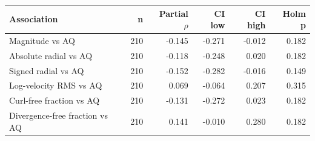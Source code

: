 \begin{tabular}{lrrrrr}
\toprule
Association & n & Partial $\rho$ & CI low & CI high & Holm p \\
\midrule
Magnitude vs AQ & 210 & -0.145 & -0.271 & -0.012 & 0.182 \\
Absolute radial vs AQ & 210 & -0.118 & -0.248 & 0.020 & 0.182 \\
Signed radial vs AQ & 210 & -0.152 & -0.282 & -0.016 & 0.149 \\
Log-velocity RMS vs AQ & 210 & 0.069 & -0.064 & 0.207 & 0.315 \\
Curl-free fraction vs AQ & 210 & -0.131 & -0.272 & 0.023 & 0.182 \\
Divergence-free fraction vs AQ & 210 & 0.141 & -0.010 & 0.280 & 0.182 \\
\bottomrule
\end{tabular}
